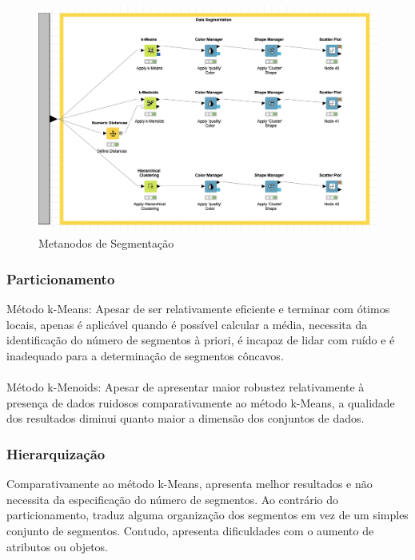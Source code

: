 \documentclass{article}
\begin{document}
\begin{figure}[H]
    \centering
    \includegraphics[scale=0.4]{Images/T7.png}
    \caption{Metanodos de Segmentação}
\end{figure}

\subsubsection{Particionamento}

Método k-Means: Apesar de ser relativamente eficiente e terminar com ótimos locais, apenas é aplicável quando é possível calcular a média, necessita da identificação do número de segmentos à priori, é incapaz de lidar com ruído e é inadequado para a determinação de segmentos côncavos. \\
\\
Método k-Menoids: Apesar de apresentar maior robustez relativamente à presença de dados ruidosos comparativamente ao método k-Means, a qualidade dos resultados diminui quanto maior a dimensão dos conjuntos de dados.

\subsubsection{Hierarquização}

Comparativamente ao método k-Means, apresenta melhor resultados e não necessita da especificação do número de segmentos.
Ao contrário do particionamento, traduz alguma organização dos segmentos em vez de um simples conjunto de segmentos.
Contudo, apresenta dificuldades com o aumento de atributos ou objetos.
\end{document}
